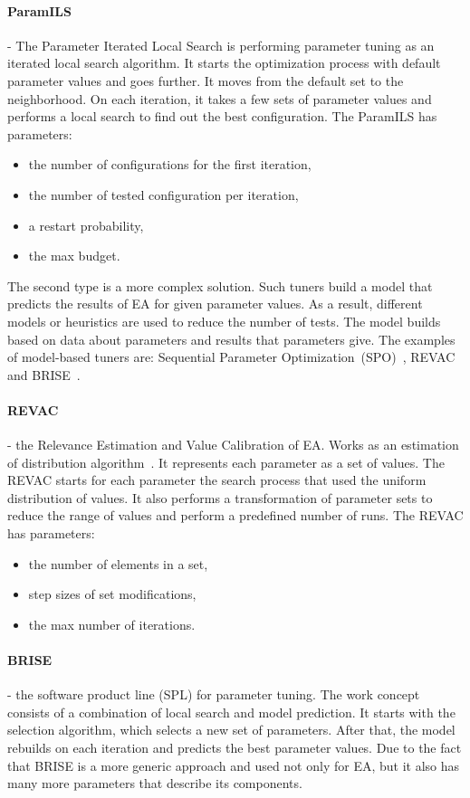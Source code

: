 \paragraph{ParamILS} - The Parameter Iterated Local Search is performing parameter tuning as an iterated local search algorithm. It starts the optimization process with default parameter values and goes further. It moves from the default set to the neighborhood. On each iteration, it takes a few sets of parameter values and performs a local search to find out the best configuration. The ParamILS has parameters:
\begin{itemize}
	\item the number of configurations for the first iteration,
	\item the number of tested configuration per iteration,
	\item a restart probability,
	\item the max budget.
\end{itemize}


The second type is a more complex solution. Such tuners build a model that predicts the results of EA for given parameter values. As a result, different models or heuristics are used to reduce the number of tests. The model builds based on data about parameters and results that parameters give. The examples of model-based tuners are: Sequential Parameter Optimization~(SPO)~\cite{bartz2004analysis}, REVAC~\cite{nannen2007efficient} and BRISE~\cite{pukhkaiev2016, pukhkaiev19}.

\paragraph{REVAC} - the Relevance Estimation and Value Calibration of EA. Works as an estimation of distribution algorithm~\cite{pelikan2002, montero2012state}. It represents each parameter as a set of values. The REVAC starts for each parameter the search process that used the uniform distribution of values. It also performs a transformation of parameter sets to reduce the range of values and perform a predefined number of runs. The REVAC has parameters:
\begin{itemize}
	\item the number of elements in a set,
	\item step sizes of set modifications,
	\item the max number of iterations.
\end{itemize} 

\paragraph{BRISE} - the software product line (SPL) for parameter tuning. The work concept consists of a combination of local search and model prediction. It starts with the selection algorithm, which selects a new set of parameters. After that, the model rebuilds on each iteration and predicts the best parameter values. Due to the fact that BRISE is a more generic approach and used not only for EA, but it also has many more parameters that describe its components.

